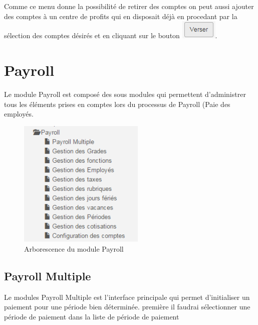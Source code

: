 \documentclass[12pt,a4paper]{report}
\begin{document}
Comme ce menu donne la possibilité de retirer des comptes on peut aussi ajouter des comptes à un centre de profits qui en disposait déjà en procedant par la sélection des comptes désirés et en cliquant sur le bouton \includegraphics[scale=0.7]{pic/VerserCompte.png}.


\newpage
\chapter{Payroll}        
Le module Payroll est composé des sous modules qui permettent d'administrer tous les éléments prises en comptes lors du processus de Payroll (Paie des employés.

\begin{figure}[h]
\begin{center}
\includegraphics[width=6cm]{pic/PayrollArbo.png}
\end{center}
\caption{Arborescence du module Payroll}
\label{Arborescence du module Payroll}
\end{figure}

\section{Payroll Multiple}
Le modules Payroll Multiple est l'interface principale qui permet d'initialiser un paiement pour une période bien déterminée.
première il faudrai sélectionner une période de paiement dans la liste de période de paiement
\end{document}

